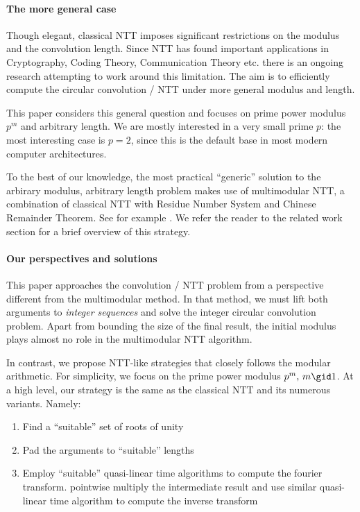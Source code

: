 \paragraph{The more general case}
Though elegant, classical NTT imposes significant restrictions on the modulus and the convolution length. Since NTT has found important applications in Cryptography, Coding Theory, Communication Theory etc. there is an ongoing research attempting to work around this limitation. The aim is to efficiently compute the circular convolution / NTT under more general modulus and length.

This paper considers this general question and focuses on prime power modulus \(p^m\) and arbitrary length. We are mostly interested in a very small prime \(p\): the most interesting case is \(p = 2\), since this is the default base in most modern computer architectures.

To the best of our knowledge, the most practical ``generic'' solution to the arbirary modulus, arbitrary length problem makes use of multimodular NTT, a combination of classical NTT with Residue Number System and Chinese Remainder Theorem. See for example . We refer the reader to the related work section for a brief overview of this strategy.

\paragraph{Our perspectives and solutions}
This paper approaches the convolution / NTT problem from a perspective different from the multimodular method. In that method, we must lift both arguments to \emph{integer sequences} and solve the integer circular convolution problem. Apart from bounding the size of the final result, the initial modulus plays almost no role in the multimodular NTT algorithm.

In contrast, we propose NTT-like strategies that closely follows the modular arithmetic. For simplicity, we focus on the prime power modulus \(p^m,\, m \gid 1\). At a high level, our strategy is the same as the classical NTT and its numerous variants. Namely:
\begin{enumerate}
    \item Find a ``suitable'' set of roots of unity
    \item Pad the arguments to ``suitable'' lengths
    \item Employ ``suitable'' quasi-linear time algorithms to compute the fourier transform. pointwise multiply the intermediate result and use similar quasi-linear time algorithm to compute the inverse transform
\end{enumerate}

